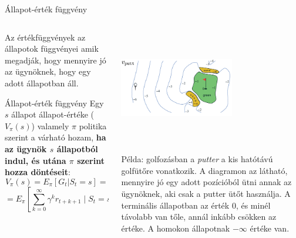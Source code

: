\documentclass[english, aspectratio=169]{beamer}
\makeatletter
\let\origtableofcontents=\tableofcontents
\def\tableofcontents{\@ifnextchar[{\origtableofcontents}{\gobbletableofcontents}}
\def\gobbletableofcontents#1{\origtableofcontents}
\makeatother
\begin{document}
\begin{frame}
\tableofcontents[currentsection]
\end{frame}

\begin{frame}{Állapot-érték függvény}
\begin{columns}
\begin{column}{.5\textwidth}
Az értékfüggvények az állapotok függvényei amik megadják, hogy mennyire jó az ügynöknek, hogy egy adott állapotban áll.
\begin{block}{Állapot-érték függvény}
Egy $s$ állapot állapot-értéke ($V_{\pi}(s)$) valamely $\pi$ politika szerint a várható hozam, \textbf{ha az ügynök $s$ állapotból indul, és utána $\pi$ szerint hozza döntéseit}:\\
\[
V_{\pi}(s)=E_{\pi}\left[G_{t}|S_{t}=s\right]=
\]
\[
=E_{\pi}\left[\sum_{k=0}^{\infty}\gamma^{k}r_{t+k+1}\mid S_{t}=s\right]
\]
\end{block}
\end{column}
\begin{column}{.5\textwidth}
\begin{center}
\includegraphics[width=5cm, height=5cm, keepaspectratio]{images/reinf_9.png}
\end{center}
\begin{small}
Példa: golfozásban a \emph{putter} a kis hatótávú golfütőre vonatkozik. A diagramon az látható, mennyire jó egy adott pozícióból ütni annak az ügynöknek, aki csak a putter ütőt használja. A terminális állapotban az érték $0$, és minél távolabb van tőle, annál inkább csökken az értéke. A homokon állapotnak $-\infty$ értéke van.
\end{small}
\end{column}
\end{columns}
\end{frame}
\end{document}
